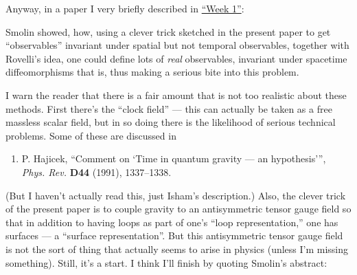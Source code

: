 \documentclass[12pt]{article}
\def\tightlist{}
\renewcommand{\texttt}[1]{%
  \begingroup
  \ttfamily
  \begingroup\lccode`~=`/\lowercase{\endgroup\def~}{/\discretionary{}{}{}}%
  \begingroup\lccode`~=`[\lowercase{\endgroup\def~}{[\discretionary{}{}{}}%
  \begingroup\lccode`~=`.\lowercase{\endgroup\def~}{.\discretionary{}{}{}}%
  \catcode`/=\active\catcode`[=\active\catcode`.=\active
  \scantokens{#1\noexpand}%
  \endgroup
}
\begin{document}
Anyway, in a paper I very briefly described in
\protect\hyperlink{week1}{``Week 1''}:
Smolin showed, how, using a clever trick sketched in the present paper
to get ``observables'' invariant under spatial but not temporal
observables, together with Rovelli's idea, one could define lots of \emph{real}
observables, invariant under spacetime diffeomorphisms that is, thus
making a serious bite into this problem.

I warn the reader that there is a fair amount that is not too realistic
about these methods. First there's the ``clock field'' --- this can
actually be taken as a free massless scalar field, but in so doing there
is the likelihood of serious technical problems. Some of these are
discussed in

\begin{enumerate}
\def\labelenumi{\arabic{enumi})}
\setcounter{enumi}{5}
\tightlist
\item
  P. Hajicek, ``Comment on `Time in quantum gravity --- an
  hypothesis''', \emph{Phys. Rev.} \textbf{D44} (1991), 1337--1338.
\end{enumerate}
(But I haven't actually read this, just Isham's description.) Also, the
clever trick of the present paper is to couple gravity to an
antisymmetric tensor gauge field so that in addition to having loops as
part of one's ``loop representation,'' one has surfaces --- a ``surface
representation''. But this antisymmetric tensor gauge field is not the
sort of thing that actually seems to arise in physics (unless I'm
missing something). Still, it's a start. I think I'll finish by quoting
Smolin's abstract:
\end{document}
